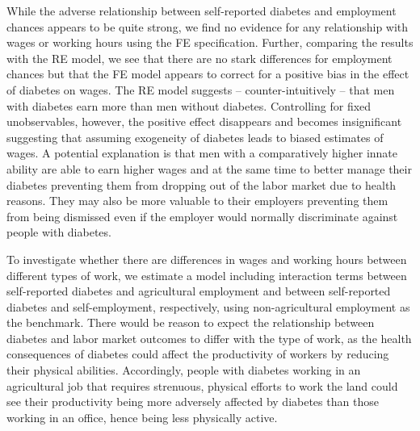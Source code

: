 \documentclass[12pt,english,british]{article}
\begin{document}
While the adverse relationship between self-reported diabetes and
employment chances appears to be quite strong, we find no evidence
for any relationship with wages or working hours using the \ac{FE} specification. Further, comparing the results with the \ac{RE} model, we see that there are no stark differences for employment chances but that the \ac{FE} model appears to correct for a positive bias in the effect of diabetes on wages. The \ac{RE} model suggests -- counter-intuitively -- that men with diabetes earn more than men without diabetes. Controlling for fixed unobservables, however, the positive effect disappears and becomes insignificant suggesting that assuming exogeneity of diabetes leads to biased estimates of wages. A potential explanation is that men with a comparatively higher innate ability are able to earn higher wages and at the same time to better manage their diabetes preventing them from dropping out of the labor market due to health reasons. They may also be more valuable to their employers preventing them from being dismissed even if the employer would normally discriminate against people with diabetes.

To investigate whether there are differences in
wages and working hours between different types of work, we estimate
a model including interaction terms between self-reported diabetes
and agricultural employment and between self-reported diabetes and
self-employment, respectively, using non-agricultural employment as
the benchmark. There would be reason to expect the relationship between
diabetes and labor market outcomes to differ with the type of work, as
the health consequences of diabetes could affect the productivity
of workers by reducing their physical abilities. Accordingly, people
with diabetes working in an agricultural job that requires strenuous,
physical efforts to work the land could see their productivity being
more adversely affected by diabetes than those working in an office,
hence being less physically active. 
\end{document}
